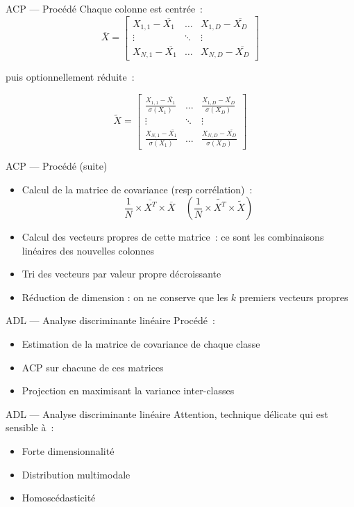 \begin{frame}{ACP --- Procédé}
  Chaque colonne est centrée~:
  \[
  \overline{X} =
  \begin{bmatrix}
    X_{1,1}-\overline{X_1} & \dots  & X_{1,D}-\overline{X_D} \\
    \vdots & \ddots & \vdots \\
    X_{N,1}-\overline{X_1} & \dots  & X_{N,D}-\overline{X_D}
  \end{bmatrix}
  \]

  puis optionnellement réduite~:

  \[
  \widetilde{X} =
  \begin{bmatrix}
    \frac{X_{1,1}-\overline{X_1}}{\sigma(X_1)} & \dots  & \frac{X_{1,D}-\overline{X_D}}{\sigma(X_D)} \\
    \vdots & \ddots & \vdots \\
    \frac{X_{N,1}-\overline{X_1}}{\sigma(X_1)} & \dots  & \frac{X_{N,D}-\overline{X_D}}{\sigma(X_D)}
  \end{bmatrix}
  \]
\end{frame}

\begin{frame}{ACP --- Procédé (suite)}
  \begin{itemize}
    \item Calcul de la matrice de covariance (resp corrélation)~:
      \[
      \frac{1}{N} \times \overline{X^T} \times \overline{X}
      \quad
      ( \frac{1}{N} \times \widetilde{X^T} \times \widetilde{X} )
      \]
    \item Calcul des vecteurs propres de cette matrice~: ce sont les combinaisons linéaires des nouvelles colonnes
    \item Tri des vecteurs par valeur propre décroissante
    \item Réduction de dimension : on ne conserve que les $k$ premiers vecteurs propres
  \end{itemize}

\end{frame}

\begin{frame}{ADL --- Analyse discriminante linéaire}
  Procédé~:

  \begin{itemize}
    \item Estimation de la matrice de covariance de chaque classe
    \item ACP sur chacune de ces matrices
    \item Projection en maximisant la variance inter-classes
  \end{itemize}
\end{frame}

\begin{frame}{ADL --- Analyse discriminante linéaire}
  Attention, technique délicate qui est sensible à~:

  \begin{itemize}
    \item Forte dimensionnalité
    \item Distribution multimodale
    \item Homoscédasticité
  \end{itemize}
\end{frame}
